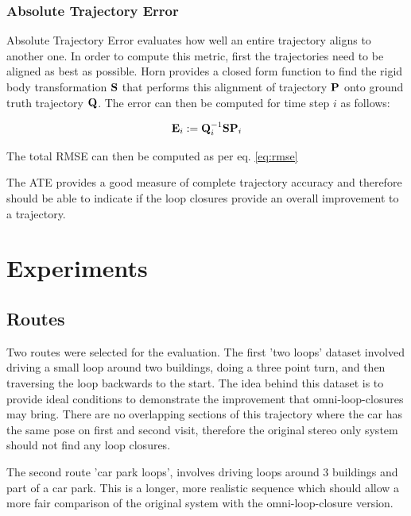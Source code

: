 \subsubsection{Absolute Trajectory Error}

Absolute Trajectory Error evaluates how well an entire trajectory aligns to another one.  In order to compute this metric, first the trajectories need to be aligned as best as possible.  Horn\cite{Horn87} provides a closed form function to find the rigid body transformation $\mathbf S$ that performs this alignment of trajectory $\mathbf P$ onto ground truth trajectory $\mathbf Q$.  The error can then be computed for time step $i$ as follows:

\begin{equation}
 \mathbf E_i := \mathbf Q_i^{-1}\mathbf S \mathbf P_i
\end{equation}

The total RMSE can then be computed as per eq. \ref{eq:rmse}

The ATE provides a good measure of complete trajectory accuracy and therefore should be able to indicate if the loop closures provide an overall improvement to a trajectory.

\section{Experiments}



\subsection{Routes}

Two routes were selected for the evaluation.  The first 'two loops' dataset involved driving a small loop around two buildings, doing a three point turn, and then traversing the loop backwards to the start.  The idea behind this dataset is to provide ideal conditions to demonstrate the improvement that omni-loop-closures may bring.  There are no overlapping sections of this trajectory where the car has the same pose on first and second visit, therefore the original stereo only system should not find any loop closures.

The second route 'car park loops', involves driving loops around 3 buildings and part of a car park.  This is a longer, more realistic sequence which should allow a more fair comparison of the original system with the omni-loop-closure version.

